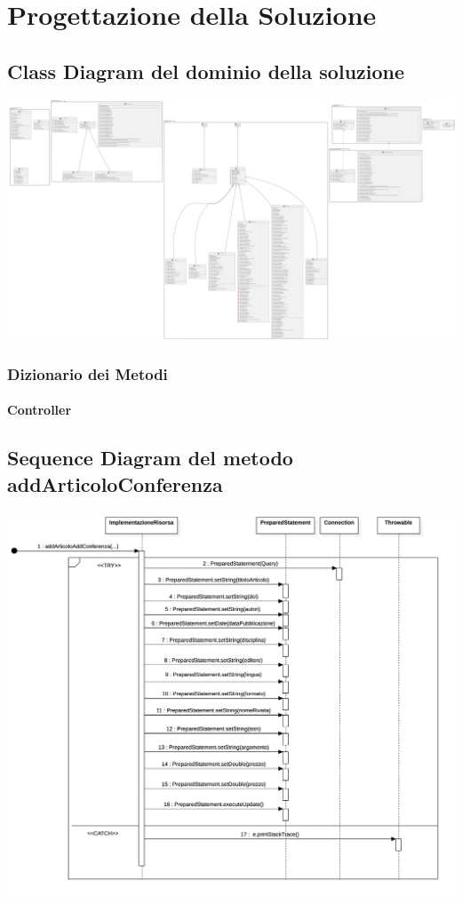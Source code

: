 \chapter{Progettazione della Soluzione}

\section{Class Diagram del dominio della soluzione}
\includegraphics[scale=0.05, center]{Immagini/PDiagram.png}

\subsection{Dizionario dei Metodi}
\subsubsection*{Controller}



\section{Sequence Diagram del metodo addArticoloConferenza}
\includegraphics[scale=0.15, center]{Immagini/AddArtConf_SD.png}

